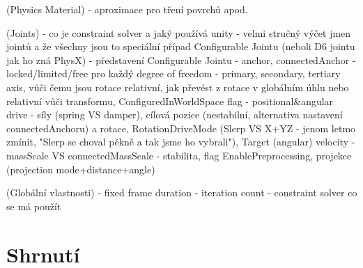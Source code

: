 (Physics Material)
- aproximace pro tření povrchů apod.

(Joints)
- co je constraint solver a jaký používá unity
- velmi stručný výčet jmen jointů a že všechny jsou to speciální případ Configurable Jointu (neboli D6 jointu jak ho zná PhysX)
- představení Configurable Jointu
    - anchor, connectedAnchor
    - locked/limited/free pro každý degree of freedom
    - primary, secondary, tertiary axis, vůči čemu jsou rotace relativní, jak převést z rotace v globálním úhlu nebo relativní vůči transformu, ConfiguredInWorldSpace flag
    - positional\&angular drive - síly (spring VS damper), cílová pozice (nestabilní, alternativa nastavení connectedAnchoru) a rotace, RotationDriveMode (Slerp VS X+YZ - jenom letmo zmínit, "Slerp se choval pěkně a tak jsme ho vybrali"), Target (angular) velocity
    - massScale VS connectedMassScale
    - stabilita, flag EnablePreprocessing, projekce (projection mode+distance+angle)

(Globální vlastnosti)
- fixed frame duration
- iteration count
- constraint solver co se má použít


\section{Shrnutí}